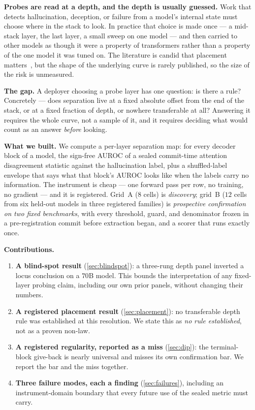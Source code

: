 \documentclass[10pt, letterpaper]{article}
\begin{document}
\textbf{Probes are read at a depth, and the depth is usually guessed.} Work that
detects hallucination, deception, or failure from a model's internal state must
choose where in the stack to look. In practice that choice is made once --- a
mid-stack layer, the last layer, a small sweep on one model --- and then carried
to other models as though it were a property of transformers rather than a
property of the one model it was tuned on. The literature is candid that
placement matters~\citep{apollo2025probes, ruan2026abort}, but the shape of the
underlying curve is rarely published, so the size of the risk is unmeasured.

\textbf{The gap.} A deployer choosing a probe layer has one question: is there a
rule? Concretely --- does separation live at a fixed absolute offset from the
end of the stack, or at a fixed fraction of depth, or nowhere transferable at
all? Answering it requires the whole curve, not a sample of it, and it requires
deciding what would count as an answer \emph{before} looking.

\textbf{What we built.} We compute a per-layer separation map: for every decoder
block of a model, the sign-free AUROC of a sealed commit-time attention
disagreement statistic against the hallucination label, plus a shuffled-label
envelope that says what that block's AUROC looks like when the labels carry no
information. The instrument is cheap --- one forward pass per row, no training,
no gradient --- and it is registered. Grid~A ($8$ cells) is \emph{discovery};
grid~B ($12$ cells from six held-out models in three registered families) is
\emph{prospective confirmation on two fixed benchmarks}, with every threshold, guard, and
denominator frozen in a pre-registration commit before extraction began, and a
scorer that runs exactly once.

\textbf{Contributions.}
\begin{enumerate}[leftmargin=1.4em, itemsep=0.15em]
  \item \textbf{A blind-spot result} (\cref{sec:blindspot}): a three-rung depth
    panel inverted a locus conclusion on a $70$B model. This bounds the
    interpretation of any fixed-layer probing claim, including our own prior
    panels, without changing their numbers.
  \item \textbf{A registered placement result} (\cref{sec:placement}): no
    transferable depth rule was established at this resolution. We state this as
    \emph{no rule established}, not as a proven non-law.
  \item \textbf{A registered regularity, reported as a miss}
    (\cref{sec:dip}): the terminal-block give-back is nearly universal and
    misses its own confirmation bar. We report the bar and the miss together.
  \item \textbf{Three failure modes, each a finding} (\cref{sec:failures}),
    including an instrument-domain boundary that every future use of the sealed
    metric must carry.
\end{enumerate}
\end{document}
